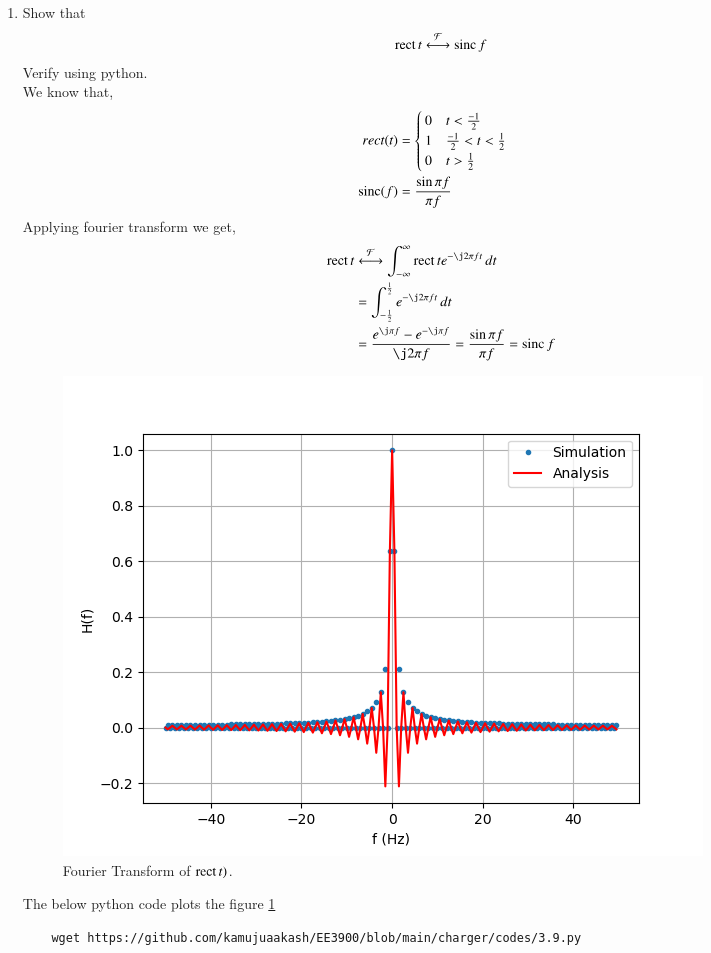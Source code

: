 \documentclass[journal,12pt,twocolumn]{IEEEtran}
\renewcommand\thesection{\arabic{section}}
\begin{document}
\begin{enumerate}[label=\thesection.\arabic*
	,ref=\thesection.\theenumi]
\begin{lstlisting}
	\end{lstlisting} 
%	
	\item Show that
	\begin{align}
		\mathop{\mathrm{rect}}{t} \overset{\mathcal{F}}{ \longleftrightarrow} \mathop{\mathrm{sinc}}{f}
	\end{align}
	Verify using python.\\
	\solution We know that,
	\begin{align}
		rect(t)&=
	\begin{cases}
		0 \quad t<\frac{-1}{2}\\
		1 \quad \frac{-1}{2}<t<\frac{1}{2}\\
		0 \quad t>\frac{1}{2}
	\end{cases}\\
\mathop{\mathrm{sinc}}(f)&=\frac{\sin{\pi f}}{\pi f}
	\end{align}
Applying fourier transform we get,
	\begin{align}
		\rect{t}&\system{F}\int_{-\infty}^{\infty}\rect{t} e^{-\j2\pi ft}\, dt \\
		&=\int_{-\frac{1}{2}}^{\frac{1}{2}}e^{-\j 2\pi ft}\, dt \\
		\label{eq:fourierrect}
		&=\frac{e^{\j\pi f} - e^{-\j\pi f}}{\j2\pi f} = \frac{\sin{\pi f}}{\pi f} = \sinc{f}
	\end{align}
	\begin{figure}[!ht]
	\includegraphics[width=\columnwidth]{figs/3.9.png}
	\caption{Fourier Transform of $\mathop{\mathrm{rect}}{t})$.}
	\label{fig:3.9}
\end{figure}
The below python code plots the figure \ref{fig:3.9}
	\begin{lstlisting}
	wget https://github.com/kamujuaakash/EE3900/blob/main/charger/codes/3.9.py
\end{lstlisting} 


\end{enumerate}
\end{document}
